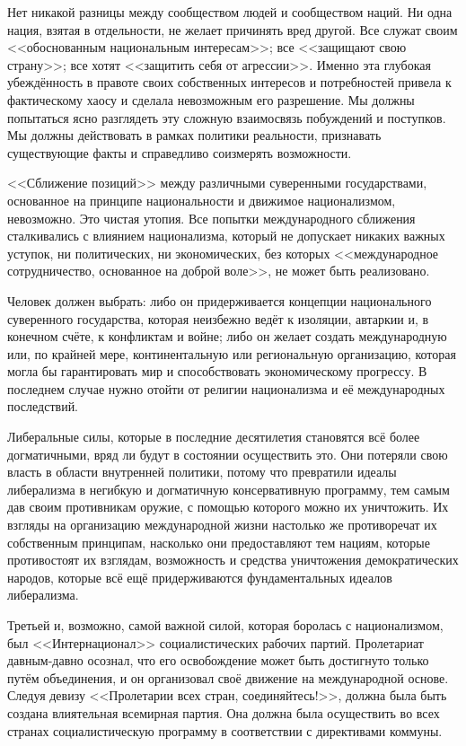 Нет никакой разницы между сообществом людей и сообществом наций. Ни одна нация, взятая в отдельности, не желает причинять вред другой. Все служат своим <<обоснованным национальным интересам>>; все <<защищают свою страну>>; все хотят <<защитить себя от агрессии>>. Именно эта глубокая убеждённость в правоте своих собственных интересов и потребностей привела к фактическому хаосу и сделала невозможным его разрешение. Мы должны попытаться ясно разглядеть эту сложную взаимосвязь побуждений и поступков. Мы должны действовать в рамках политики реальности, признавать существующие факты и справедливо соизмерять возможности.

<<Сближение позиций>> между различными суверенными государствами, основанное на принципе национальности и движимое национализмом, невозможно. Это чистая утопия. Все попытки международного сближения сталкивались с влиянием национализма, который не допускает никаких важных уступок, ни политических, ни экономических, без которых <<международное сотрудничество, основанное на доброй воле>>, не может быть реализовано.

Человек должен выбрать: либо он придерживается концепции национального суверенного государства, которая неизбежно ведёт к изоляции, автаркии и, в конечном счёте, к конфликтам и войне; либо он желает создать международную или, по крайней мере, континентальную или региональную организацию, которая могла бы гарантировать мир и способствовать экономическому прогрессу. В последнем случае нужно отойти от религии национализма и её международных последствий.

Либеральные силы, которые в последние десятилетия становятся всё более догматичными, вряд ли будут в состоянии осуществить это. Они потеряли свою власть в области внутренней политики, потому что превратили идеалы либерализма в негибкую и догматичную консервативную программу, тем самым дав своим противникам оружие, с помощью которого можно их уничтожить. Их взгляды на организацию международной жизни настолько же противоречат их собственным принципам, насколько они предоставляют тем нациям, которые противостоят их взглядам, возможность и средства уничтожения демократических народов, которые всё ещё придерживаются фундаментальных идеалов либерализма.

Третьей и, возможно, самой важной силой, которая боролась с национализмом, был <<Интернационал>> социалистических рабочих партий. Пролетариат давным-давно осознал, что его освобождение может быть достигнуто только путём объединения, и он организовал своё движение на международной основе. Следуя девизу <<Пролетарии всех стран, соединяйтесь!>>, должна была быть создана влиятельная всемирная партия. Она должна была осуществить во всех странах социалистическую программу в соответствии с директивами коммуны.


